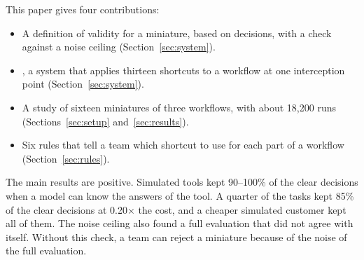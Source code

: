This paper gives four contributions:
\begin{itemize}
  \item A definition of validity for a miniature, based on decisions, with a check against a noise
  ceiling (Section~\ref{sec:system}).
  \item \sys{}, a system that applies thirteen shortcuts to a workflow at one interception point
  (Section~\ref{sec:system}).
  \item A study of sixteen miniatures of three workflows, with about 18{,}200 runs
  (Sections~\ref{sec:setup} and~\ref{sec:results}).
  \item Six rules that tell a team which shortcut to use for each part of a workflow
  (Section~\ref{sec:rules}).
\end{itemize}

The main results are positive. Simulated tools kept 90--100\% of the clear decisions when a model
can know the answers of the tool. A quarter of the tasks kept 85\% of the clear decisions at
0.20$\times$ the cost, and a cheaper simulated customer kept all of them. The noise ceiling also
found a full evaluation that did not agree with itself. Without this check, a team can reject a
miniature because of the noise of the full evaluation.
